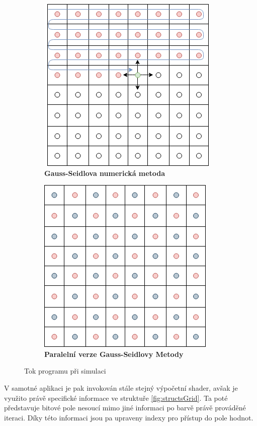 \begin{figure}[h]
	\centering
	\begin{subfigure}[t]{.5\textwidth}
			\centering
        	\includegraphics[scale=0.5]{obrazky-figures/Gauss.png}
        	\caption{\textbf{Gauss-Seidlova numerická metoda}}
        	\label{fig:GaussSeidl}
	\end{subfigure}%
	\begin{subfigure}[t]{.5\textwidth}
		\centering
		\includegraphics[scale=0.5]{obrazky-figures/GaussRB.png}
		\caption{\textbf{Paralelní verze Gauss-Seidlovy Metody}}
		\label{fig:GaussSeildRB}
	\end{subfigure}
	\caption{Tok programu při simulaci}
	\label{fig:numGauss}
\end{figure}

V samotné aplikaci je pak invokován stále stejný výpočetní shader, avšak je využito právě specifické informace ve struktuře \ref{fig:structsGrid}. Ta poté představuje bitové pole nesoucí mimo jiné informaci po barvě právě prováděné iteraci. Díky této informaci jsou pa upraveny indexy pro přístup do pole hodnot.

